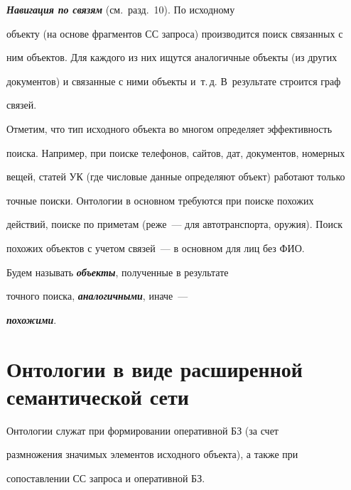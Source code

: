     \smallskip


    


    {\bfseries\textit{Навигация по связям}} (см.\ разд.~10). По исходному 


объекту (на основе фрагментов СС запроса) производится поиск связанных с 


ним объектов. Для каждого из них ищутся аналогичные объекты (из других 


документов) и связанные с ними объекты и~т.\,д. В~результате строится граф 


связей.


    


    Отметим, что тип исходного объекта во многом определяет эффективность 


поиска. Например, при поиске телефонов, сайтов, дат, документов, номерных 


вещей, статей УК (где числовые данные определяют объект) работают только 


точные поиски. Онтологии в основном требуются при поиске похожих 


действий, поиске по приметам (реже~--- для автотранспорта, оружия). Поиск 


похожих объектов с учетом связей~--- в основном для лиц без ФИО.


    


    Будем называть {\bfseries\textit{объекты}}, полученные в результате 


точного поиска, {\bfseries\textit{аналогичными}}, иначе~--- 


{\bfseries\textit{похожими}}.


    


\section{Онтологии в виде расширенной семантической сети}


    


    Онтологии служат при формировании оперативной БЗ (за счет 


размножения значимых элементов исходного объекта), а также при 


сопоставлении СС запроса и оперативной БЗ.


    


